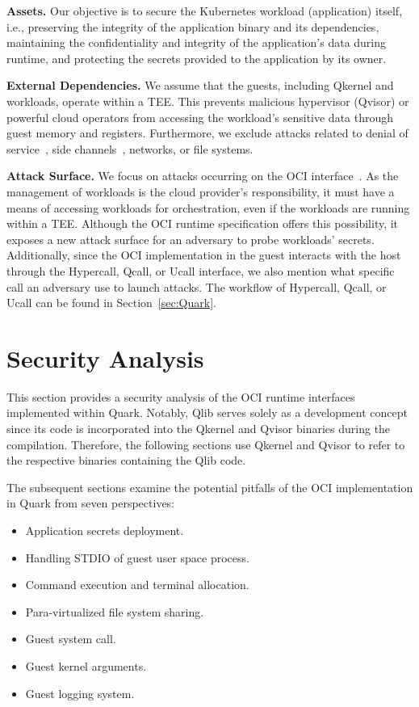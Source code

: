 \textbf{Assets.} Our objective is to secure the Kubernetes workload (application) itself, i.e., preserving the integrity of the application binary and its dependencies, maintaining the confidentiality and integrity of the application's data during runtime, and protecting the secrets provided to the application by its owner.

\textbf{External Dependencies.} We assume that the guests, including Qkernel and workloads, operate within a TEE. This prevents malicious hypervisor (Qvisor) or powerful cloud operators from accessing the workload's sensitive 
data through guest memory and registers. Furthermore, we exclude attacks related to denial of service~\cite*{DOS_ATTACK}, side channels~\cite*{217454}, networks, or file systems.


\textbf{Attack Surface.} We focus on attacks occurring on the OCI interface~\cite*{oci-runtime-spec}. As the management of workloads is the cloud provider's responsibility, it must have a means of accessing workloads for orchestration, even if the 
workloads are running within a TEE. Although the OCI runtime specification offers this possibility, it exposes a new attack surface for an adversary to probe workloads' secrets. Additionally, since the OCI  implementation in the guest interacts with 
the host through the Hypercall, Qcall, or Ucall interface, we also mention what specific call an adversary use to launch attacks. The workflow of Hypercall, Qcall, or Ucall can be found in Section~\ref{sec:Quark}.


\section{Security Analysis}
\label{sec:security_analysis}
This section provides a security analysis of the OCI runtime interfaces~\cite*{oci-runtime-spec} implemented within Quark. Notably, Qlib serves solely as a development concept since its code is incorporated into the Qkernel and Qvisor binaries 
during the compilation. Therefore, the following sections use Qkernel and Qvisor to refer to the respective binaries containing the Qlib code.

The subsequent sections examine the potential pitfalls of the OCI implementation in Quark from seven perspectives:

\begin{itemize}
  \item Application secrets deployment.
  \item Handling STDIO of guest user space process.
  \item Command execution and terminal allocation.
  \item Para-virtualized file system sharing.
  \item Guest system call.
  \item Guest kernel arguments.
  \item Guest logging system. 
\end{itemize}

